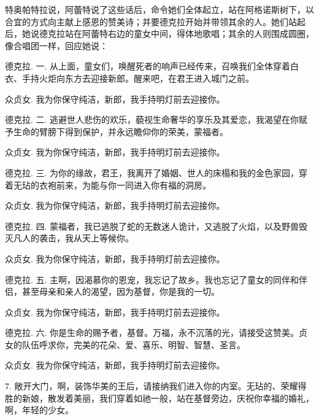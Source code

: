 特奥帕特拉说，阿蕾特说了这些话后，命令她们全体起立，站在阿格诺斯树下，以合宜的方式向主献上感恩的赞美诗；并要德克拉开始并带领其余的人。她们站起后，她说德克拉站在阿蕾特右边的童女中间，得体地歌唱；其余的人则围成圆圈，像合唱团一样，回应她说：\par

德克拉. 一. 从上面，童女们，唤醒死者的响声已经传来，召唤我们全体穿着白衣、手持火炬向东方去迎接新郎。醒来吧，在君王进入城门之前。\par

众贞女. 我为你保守纯洁，新郎，我手持明灯前去迎接你。\par

德克拉. 二. 逃避世人悲伤的欢乐，藐视生命奢华的享乐及其爱恋，我渴望在你赋予生命的臂膀下得到保护，并永远瞻仰你的荣美，蒙福者。\par

众贞女. 我为你保守纯洁，新郎，我手持明灯前去迎接你。\par

德克拉. 三. 为你的缘故，君王，我离开了婚姻、世人的床榻和我的金色家园，穿着无玷的衣袍前来，为能与你一同进入你有福的洞房。\par

众贞女. 我为你保守纯洁，新郎，我手持明灯前去迎接你。\par

德克拉. 四. 蒙福者，我已逃脱了蛇的无数迷人诡计，又逃脱了火焰，以及野兽毁灭凡人的袭击，我从天上等候你。\par

众贞女. 我为你保守纯洁，新郎，我手持明灯前去迎接你。\par

德克拉. 五. 主啊，因渴慕你的恩宠，我忘记了故乡。我也忘记了童女的同伴和伴侣，甚至母亲和亲人的渴望，因为基督，你是我的一切。\par

众贞女. 我为你保守纯洁，新郎，我手持明灯前去迎接你。\par

德克拉. 六. 你是生命的赐予者，基督。万福，永不沉落的光，请接受这赞美。贞女的队伍呼求你，完美的花朵、爱、喜乐、明智、智慧、圣言。\par

众贞女. 我为你保守纯洁，新郎，我手持明灯前去迎接你。\par

 7. 敞开大门，啊，装饰华美的王后，请接纳我们进入你的内室。无玷的、荣耀得胜的新娘，散发着美丽，我们穿着如祂一般，站在基督旁边，庆祝你幸福的婚礼，啊，年轻的少女。\par

